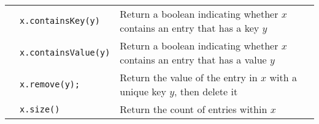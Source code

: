 \documentclass{article}
\begin{document}
\begin{center}
\begin{tabularx}{\textwidth}{llX}
                                       & \lstinline|x.containsKey(y)| & Return a boolean indicating whether \(x\) contains an entry that has a key \(y\)\\
                                       & \lstinline|x.containsValue(y)| & Return a boolean indicating whether \(x\) contains an entry that has a value \(y\)\\
                                       & \lstinline|x.remove(y);| & Return the value of the entry in \(x\) with a unique key \(y\), then delete it\\
                                       & \lstinline|x.size()| & Return the count of entries within \(x\)
\\\bottomrule\end{tabularx}\end{center}





\end{document}
